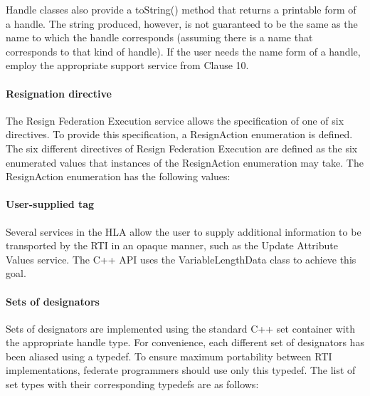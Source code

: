 \begin{compactstdpage}
    Handle classes also provide a toString() method that returns a printable form of a handle. The string produced, however, is not guaranteed to be the same as the name to which the handle corresponds (assuming there is a name that corresponds to that kind of handle). If the user needs the name form of a handle, employ the appropriate support service from Clause 10.

    \paragraph{Resignation directive}

    The Resign Federation Execution service allows the specification of one of six directives. To provide this specification, a ResignAction enumeration is defined. The six different directives of Resign Federation Execution are defined as the six enumerated values that instances of the ResignAction enumeration may take. The ResignAction enumeration has the following values:


    \paragraph{User-supplied tag}

    Several services in the HLA allow the user to supply additional information to be transported by the RTI in an opaque manner, such as the Update Attribute Values service. The C++ API uses the VariableLengthData class to achieve this goal.

    \paragraph{Sets of designators}

    Sets of designators are implemented using the standard C++ set container with the appropriate handle type. For convenience, each different set of designators has been aliased using a typedef. To ensure maximum portability between RTI implementations, federate programmers should use only this typedef. The list of set types with their corresponding typedefs are as follows:


\end{compactstdpage}
